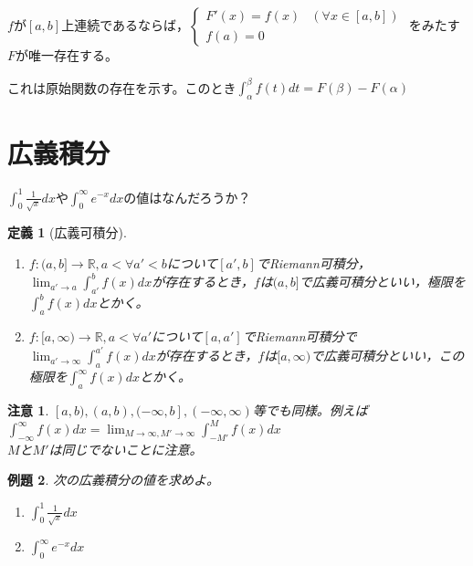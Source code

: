 \documentclass[dvipdfmx,a4j,10pt]{jsarticle}
\theoremstyle{mystyle1}
\newtheorem{dfn}{定義}[part]
\newtheorem{ex}[dfn]{例題}
\theoremstyle{mystyle2}
\newtheorem{note}{注意}
\begin{document}
\begin{framed}
    $f$が$[a,b]$上連続であるならば，$
    \begin{cases}
    F'(x)=f(x) & (\forall x\in[a,b])\\
    f(a)=0 & \
    \end{cases}
    $
    をみたす$F$が唯一存在する。
\end{framed}

これは原始関数の存在を示す。このとき$\displaystyle\int_\alpha^\beta f(t)dt=F(\beta)-F(\alpha)$

\newpage

\section{広義積分}
$\displaystyle \int_0^1\frac{1}{\sqrt{x}}dx$や$\displaystyle \int_0^\infty e^{-x}dx$の値はなんだろうか？

\begin{framed}
    \begin{dfn}[広義可積分]\label{def11.1}\
        \begin{enumerate}
            \item
            $f:(a,b]\to\mathbb{R},a<\forall a'<b$について$[a',b]$でRiemann可積分，$\displaystyle\lim_{a'\to a}\int_{a'}^b f(x)dx$が存在するとき，$f$は$(a,b]$で広義可積分といい，極限を$\displaystyle\int_a^b f(x)dx$とかく。\footnotemark
            \item
            $f:[a,\infty)\to\mathbb{R},a<\forall a'$について$[a,a']$でRiemann可積分で$\displaystyle\lim_{a'\to\infty}\int_a^{a'}f(x)dx$が存在するとき，$f$は$[a,\infty)$で広義可積分といい，この極限を$\displaystyle\int_a^\infty f(x)dx$とかく。
        \end{enumerate}
    \end{dfn}
\end{framed}

\begin{note}
    $[a,b),(a,b),(-\infty,b],(-\infty,\infty)$等でも同様。例えば$\displaystyle\int_{-\infty}^\infty f(x)dx=\lim_{M\to\infty,M'\to\infty}\int_{-M'}^M f(x)dx$\\
    $M$と$M'$は同じでないことに注意。
\end{note}

\begin{shaded}
    \begin{ex}\label{ex2.44} 次の広義積分の値を求めよ。
        \begin{enumerate}
            \item $\displaystyle\int_0^1\frac{1}{\sqrt{x}}dx$
            \item $\displaystyle\int_0^\infty e^{-x}dx$
        \end{enumerate}
    \end{ex}
\end{shaded}
\end{document}

